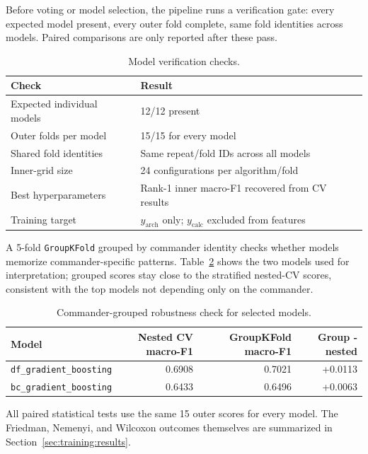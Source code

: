 \documentclass{article}
\begin{document}
Before voting or model selection, the pipeline runs a verification gate: every expected model present, every outer fold complete, same fold identities across models. Paired comparisons are only reported after these pass.

\begin{table}[h]
\centering
\caption{Model verification checks.}
\label{tab:verification-checks}
\small
\begin{tabular}{ll}
\toprule
Check & Result \\
\midrule
Expected individual models & 12/12 present \\
Outer folds per model & 15/15 for every model \\
Shared fold identities & Same repeat/fold IDs across all models \\
Inner-grid size & 24 configurations per algorithm/fold \\
Best hyperparameters & Rank-1 inner macro-F1 recovered from CV results \\
Training target & \(y_{\text{arch}}\) only; \(y_{\text{calc}}\) excluded from features \\
\bottomrule
\end{tabular}
\end{table}

A 5-fold \texttt{GroupKFold} grouped by commander identity checks whether models memorize commander-specific patterns. Table~\ref{tab:groupkfold} shows the two models used for interpretation; grouped scores stay close to the stratified nested-CV scores, consistent with the top models not depending only on the commander.

\begin{table}[h]
\centering
\caption{Commander-grouped robustness check for selected models.}
\label{tab:groupkfold}
\small
\begin{tabular}{lrrr}
\toprule
Model & Nested CV macro-F1 & GroupKFold macro-F1 & Group - nested \\
\midrule
\texttt{df\_gradient\_boosting} & 0.6908 & 0.7021 & +0.0113 \\
\texttt{bc\_gradient\_boosting} & 0.6433 & 0.6496 & +0.0063 \\
\bottomrule
\end{tabular}
\end{table}

All paired statistical tests use the same 15 outer scores for every model. The Friedman, Nemenyi, and Wilcoxon outcomes themselves are summarized in Section~\ref{sec:training:results}.
\end{document}
